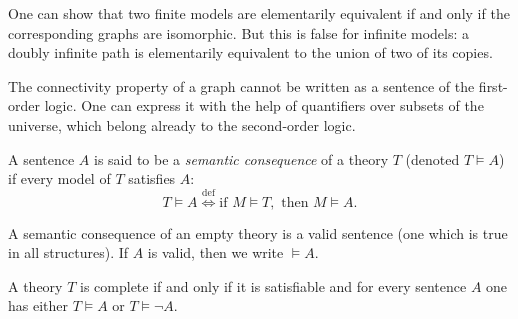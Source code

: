 \begin{page}
\setcounter{section}{3}
\setcounter{subsection}{1}
\setcounter{dfn}{9}
\label{portion:602}

\begin{rem}
One can show that two finite models are elementarily equivalent if and only if the corresponding graphs are isomorphic.
But this is false for infinite models: a doubly infinite path is elementarily equivalent to the union of two of its copies.

The connectivity property of a graph cannot be written as a sentence of the first-order logic.
One can express it with the help of quantifiers over subsets of the universe, which belong already to the second-order logic.
\end{rem}

\end{page}

\begin{page}
\setcounter{section}{3}
\setcounter{subsection}{1}
\setcounter{dfn}{10}
\label{portion:605}

\begin{dfn}
A sentence $A$ is said to be a \emph{semantic consequence} of a theory $T$ (denoted $T \vDash A$) if every model of $T$ satisfies $A$:
\[
T \vDash A \stackrel{\mathrm{def}}{\Longleftrightarrow} \text{if } M \vDash T, \text{ then } M \vDash A.
\]
\end{dfn}

\end{page}

\begin{page}
\setcounter{section}{3}
\setcounter{subsection}{1}
\setcounter{dfn}{11}
\label{portion:608}

\begin{exl}
A semantic consequence of an empty theory is a valid sentence (one which is true in all structures).
If $A$ is valid, then we write $\vDash A$.
\end{exl}

\end{page}

\begin{page}
\setcounter{section}{3}
\setcounter{subsection}{1}
\setcounter{dfn}{12}
\label{portion:611}

\begin{lem}
A theory $T$ is complete if and only if it is satisfiable and for every sentence $A$ one has either $T \vDash A$ or $T \vDash \neg A$.
\end{lem}

\end{page}

